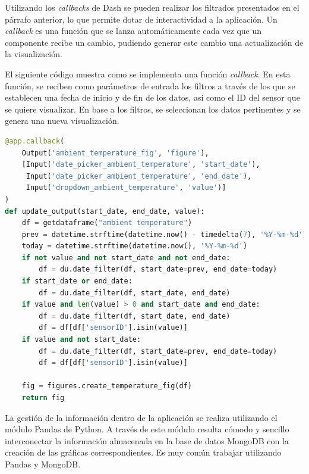 \documentclass[a4paper, 12pt, oneside]{book}
\begin{document}
Utilizando los \textit{callbacks} de Dash se pueden realizar los filtrados presentados en el párrafo anterior, lo que permite dotar de interactividad a la aplicación. Un \textit{callback} es una función que se lanza automáticamente cada vez que un componente recibe un cambio, pudiendo generar este cambio una actualización de la visualización.


El siguiente código muestra como se implementa una función \textit{callback}. En esta función, se reciben como parámetros de entrada los filtros a través de los que se establecen una fecha de inicio y de fin de los datos, así como el ID del sensor que se quiere visualizar.  En base a los filtros, se seleccionan los datos pertinentes y se genera una nueva visualización.

\begin{lstlisting}[language=Python]
@app.callback(
    Output('ambient_temperature_fig', 'figure'),
    [Input('date_picker_ambient_temperature', 'start_date'),
     Input('date_picker_ambient_temperature', 'end_date'),
     Input('dropdown_ambient_temperature', 'value')]
)
def update_output(start_date, end_date, value):
    df = getdataframe("ambient temperature")
    prev = datetime.strftime(datetime.now() - timedelta(7), '%Y-%m-%d')
    today = datetime.strftime(datetime.now(), '%Y-%m-%d')
    if not value and not start_date and not end_date:
        df = du.date_filter(df, start_date=prev, end_date=today)
    if start_date or end_date:
        df = du.date_filter(df, start_date, end_date)
    if value and len(value) > 0 and start_date and end_date:
        df = du.date_filter(df, start_date, end_date)
        df = df[df['sensorID'].isin(value)]
    if value and not start_date:
        df = du.date_filter(df, start_date=prev, end_date=today)
        df = df[df['sensorID'].isin(value)]

    fig = figures.create_temperature_fig(df)
    return fig
\end{lstlisting}

La gestión de la información dentro de la aplicación se realiza utilizando el módulo Pandas de Python. A través de este módulo resulta cómodo y sencillo interconectar la información almacenada en la base de datos MongoDB con la creación de las gráficas correspondientes.
Es muy común trabajar utilizando Pandas y MongoDB. 
\end{document}
